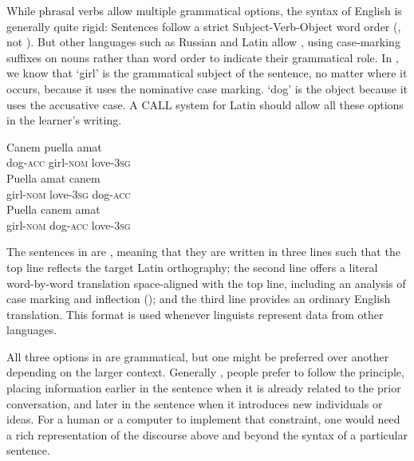 While phrasal verbs allow multiple grammatical options, the syntax of English is generally quite rigid: Sentences follow a strict Subject-Verb-Object word order (, not ).  But other languages such as Russian and Latin allow , using case-marking suffixes on nouns rather than word order to indicate their grammatical role.  In  , we know that  `girl' is the grammatical subject of the sentence, no matter where it occurs, because it uses the nominative case marking.   `dog' is the object because it uses the accusative case.  A CALL system for Latin should allow all these options in the learner's writing.



\ea \label{latin}
    \ea \gll Canem puella amat \\
        dog-\textsc{acc} girl-\textsc{nom} love-\textsc{3sg} \\
    \ex \gll Puella amat canem \\
        girl-\textsc{nom}  love-\textsc{3sg} dog-\textsc{acc} \\
    \ex  \gll Puella canem amat \\
        girl-\textsc{nom}   dog-\textsc{acc} love-\textsc{3sg} \\
\z
\z 

The sentences in   are , meaning that they are written in three lines such that the top line reflects the target Latin orthography; the second line offers a literal word-by-word translation space-aligned with the top line, including an analysis of case marking and inflection (); and the third line provides an ordinary English translation.  This format is used whenever linguists represent data from other languages.

All three options in  are grammatical, but one might be preferred over another depending on the larger context.  Generally \citep{ClarkClark:1977}, people prefer to follow the  principle, placing information earlier in the sentence when it is already related to the prior conversation, and later in the sentence when it introduces new individuals or ideas.  For a human or a computer to implement that constraint, one would need a rich representation of the discourse above and beyond the syntax of a particular sentence.

